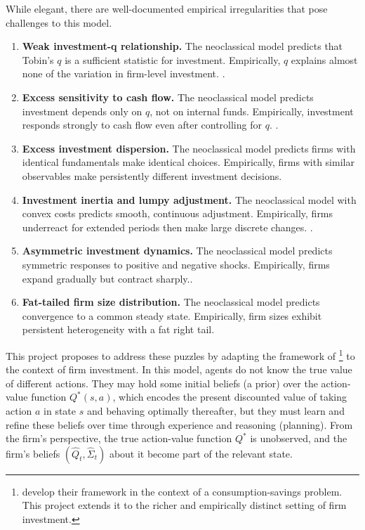 While elegant, there are well-documented empirical irregularities that pose challenges
to this model.
\begin{enumerate}
    \item \textbf{Weak investment-q relationship.} The neoclassical model predicts that 
    Tobin's $q$ is a sufficient statistic for investment. Empirically, $q$ explains almost 
    none of the variation in firm-level investment. \citep{FazzariHubbardPetersen1988,Hubbard1998,EricksonWhited2000, AbelEberly1996}.
    \item \textbf{Excess sensitivity to cash flow.} The neoclassical model predicts 
    investment depends only on $q$, not on internal funds. Empirically, investment responds 
    strongly to cash flow even after controlling for $q$. \citep{FazzariHubbardPetersen1988,KaplanZingales1997,Lamont1997, AbelEberly1996}.
    \item \textbf{Excess investment dispersion.} The neoclassical model predicts firms 
    with identical fundamentals make identical choices. Empirically, firms with similar 
    observables make persistently different investment decisions. \citep{HsiehKlenow2009, BachmannBayer2014}
    \item \textbf{Investment inertia and lumpy adjustment.} The neoclassical model with 
    convex costs predicts smooth, continuous adjustment. Empirically, firms underreact for 
    extended periods then make large discrete changes. \citep{DomsDunne1998,CooperHaltiwanger2006}.
    \item \textbf{Asymmetric investment dynamics.} The neoclassical model predicts 
    symmetric responses to positive and negative shocks. Empirically, firms expand gradually 
    but contract sharply.\citep{AbelEberly1996,CaballeroEngel1999}.
    \item \textbf{Fat-tailed firm size distribution.} The neoclassical model predicts 
    convergence to a common steady state. Empirically, firm sizes exhibit persistent 
    heterogeneity with a fat right tail. \citep{Lucas1978, Luttmer2007}
\end{enumerate}

This project proposes to address these puzzles by adapting the framework of 
\cite{IlutValchev2023}\footnote{\cite{IlutValchev2023} develop their framework in the 
context of a consumption-savings problem. This project extends it to the richer and 
empirically distinct setting of firm investment.} to the context of firm investment. In 
this model, agents do not know the true value of different actions. They may hold some 
initial beliefs (a prior) over the action-value function $Q^*(s, a)$, which encodes the 
present discounted value of taking action $a$ in state $s$ and behaving optimally 
thereafter, but they must learn and refine these beliefs over time through experience and 
reasoning (planning). From the firm's perspective, the true action-value function $Q^*$ is 
unobserved, and the firm's beliefs $(\hat{Q}_t, \hat{\Sigma}_t)$ about it become part of 
the relevant state.

